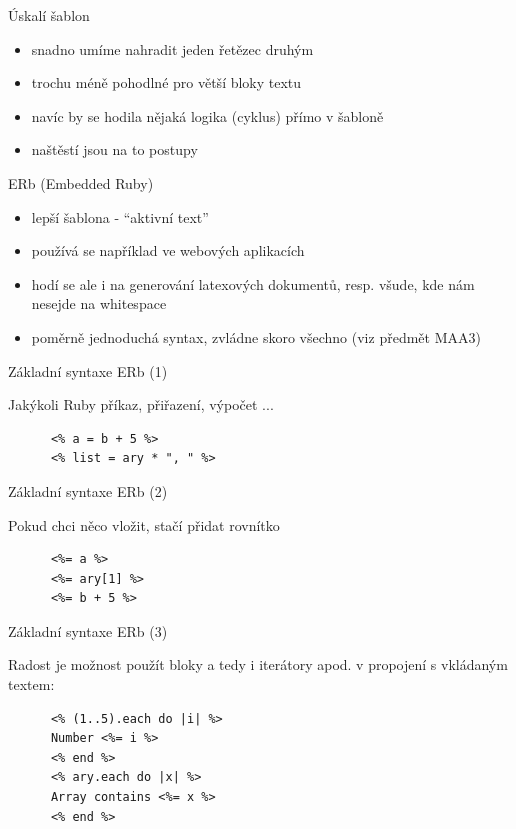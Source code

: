 \documentclass{beamer}
\begin{document}
\begin{frame}{Úskalí šablon}
  \begin{itemize}
    \item snadno umíme nahradit jeden řetězec druhým
    \item trochu méně pohodlné pro větší bloky textu
    \item navíc by se hodila nějaká logika (cyklus) přímo v šabloně
    \item naštěstí jsou na to postupy
  \end{itemize}
\end{frame}

\begin{frame}{ERb (Embedded Ruby)}
  \begin{itemize}
    \item lepší šablona - ``aktivní text''
    \item používá se například ve webových aplikacích
    \item hodí se ale i na generování latexových dokumentů, resp. všude, kde nám nesejde na whitespace
    \item poměrně jednoduchá syntax, zvládne skoro všechno (viz předmět MAA3)
  \end{itemize}
\end{frame}


\begin{frame}[fragile]{Základní syntaxe ERb (1)}
  \begin{block}{ }
    Jakýkoli Ruby příkaz, přiřazení, výpočet ...
    \scriptsize
    \begin{verbatim}
      <% a = b + 5 %>
      <% list = ary * ", " %>
    \end{verbatim}
  \end{block}
\end{frame}

\begin{frame}[fragile]{Základní syntaxe ERb (2)}
  \begin{block}{ }
    Pokud chci něco vložit, stačí přidat rovnítko
    \scriptsize
    \begin{verbatim}
      <%= a %>
      <%= ary[1] %>
      <%= b + 5 %>
    \end{verbatim}
  \end{block}
\end{frame}

\begin{frame}[fragile]{Základní syntaxe ERb (3)}
  \begin{block}{ }
    Radost je možnost použít bloky a tedy i iterátory apod. v propojení s vkládaným textem:
    \scriptsize
    \begin{verbatim}
      <% (1..5).each do |i| %>
      Number <%= i %>
      <% end %>
      <% ary.each do |x| %>
      Array contains <%= x %>
      <% end %>
    \end{verbatim}
  \end{block}
\end{frame}
\end{document}
